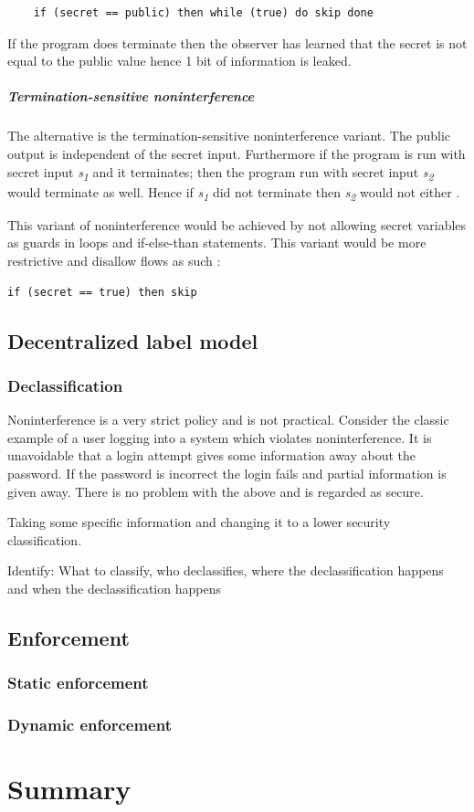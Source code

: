 \begin{lstlisting}
	if (secret == public) then while (true) do skip done
\end{lstlisting}

If the program does terminate then the observer has learned that the secret is not equal to the public value hence 1 bit of information is leaked. 


\subparagraph{Termination-sensitive noninterference}
The alternative is the termination-sensitive noninterference variant. The public output is independent of the secret input. Furthermore if the program is run with secret input \emph{s\textsubscript{1}} and it terminates; then the program run with secret input \emph{s\textsubscript{2}} would terminate as well. Hence if \emph{s\textsubscript{1}} did not terminate then \emph{s\textsubscript{2}} would not either \cite{Hedin2011}.


This variant of noninterference would be achieved by not allowing secret variables as guards in loops and if-else-than statements. This variant would be more restrictive and disallow flows as such \cite{Kashyap2011}:

\begin{lstlisting}
if (secret == true) then skip
\end{lstlisting}



\subsection{Decentralized label model}



\subsubsection{Declassification}

Noninterference is a very strict policy and is not practical. Consider the classic example of a user logging into a system which violates noninterference. It is unavoidable that a login attempt gives some information away about the password. If the password is incorrect the login fails and partial information is given away. There is no problem with the above and is regarded as secure.


Taking some specific information and changing it to a lower security classification.

Identify: What to classify, who declassifies, where the declassification happens and when the declassification happens


\subsection{Enforcement}

\subsubsection{Static enforcement}


\subsubsection{Dynamic enforcement}


\section{Summary}

